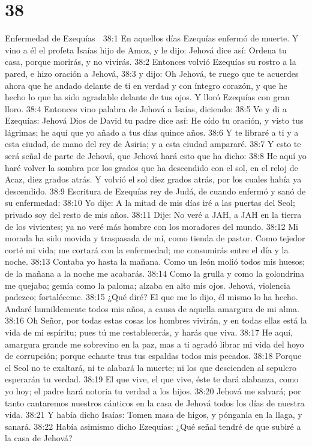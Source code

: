 \chapter{38}

Enfermedad de Ezequías  
 
38:1 En aquellos días Ezequías enfermó de muerte. Y vino a él el profeta Isaías hijo de Amoz, y le dijo: Jehová dice así: Ordena tu casa, porque morirás, y no vivirás.  
38:2 Entonces volvió Ezequías su rostro a la pared, e hizo oración a Jehová,  
38:3 y dijo: Oh Jehová, te ruego que te acuerdes ahora que he andado delante de ti en verdad y con íntegro corazón, y que he hecho lo que ha sido agradable delante de tus ojos. Y lloró Ezequías con gran lloro.  
38:4 Entonces vino palabra de Jehová a Isaías, diciendo:  
38:5 Ve y di a Ezequías: Jehová Dios de David tu padre dice así: He oído tu oración, y visto tus lágrimas; he aquí que yo añado a tus días quince años.  
38:6 Y te libraré a ti y a esta ciudad, de mano del rey de Asiria; y a esta ciudad ampararé.  
38:7 Y esto te será señal de parte de Jehová, que Jehová hará esto que ha dicho:  
38:8 He aquí yo haré volver la sombra por los grados que ha descendido con el sol, en el reloj de Acaz, diez grados atrás. Y volvió el sol diez grados atrás, por los cuales había ya descendido.  
38:9 Escritura de Ezequías rey de Judá, de cuando enfermó y sanó de su enfermedad:  
38:10 Yo dije: A la mitad de mis días iré a las puertas del Seol; privado soy del resto de mis años.  
38:11 Dije: No veré a JAH, a JAH en la tierra de los vivientes; ya no veré más hombre con los moradores del mundo.  
38:12 Mi morada ha sido movida y traspasada de mí, como tienda de pastor. Como tejedor corté mi vida; me cortará con la enfermedad; me consumirás entre el día y la noche.  
38:13 Contaba yo hasta la mañana. Como un león molió todos mis huesos; de la mañana a la noche me acabarás.  
38:14 Como la grulla y como la golondrina me quejaba; gemía como la paloma; alzaba en alto mis ojos. Jehová, violencia padezco; fortaléceme.  
38:15 ¿Qué diré? El que me lo dijo, él mismo lo ha hecho. Andaré humildemente todos mis años, a causa de aquella amargura de mi alma.  
38:16 Oh Señor, por todas estas cosas los hombres vivirán, y en todas ellas está la vida de mi espíritu; pues tú me restablecerás, y harás que viva.  
38:17 He aquí, amargura grande me sobrevino en la paz, mas a ti agradó librar mi vida del hoyo de corrupción; porque echaste tras tus espaldas todos mis pecados.  
38:18 Porque el Seol no te exaltará, ni te alabará la muerte; ni los que descienden al sepulcro esperarán tu verdad.  
38:19 El que vive, el que vive, éste te dará alabanza, como yo hoy; el padre hará notoria tu verdad a los hijos.  
38:20 Jehová me salvará; por tanto cantaremos nuestros cánticos en la casa de Jehová todos los días de nuestra vida.  
38:21 Y había dicho Isaías: Tomen masa de higos, y pónganla en la llaga, y sanará.  
38:22 Había asimismo dicho Ezequías: ¿Qué señal tendré de que subiré a la casa de Jehová?  

